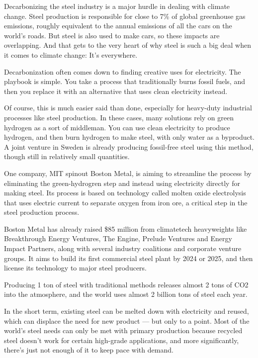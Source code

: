 \documentclass[
]{book}
\begin{document}
Decarbonizing the steel industry is a major hurdle in dealing with climate change. Steel production is responsible for close to 7\% of global greenhouse gas emissions, roughly equivalent to the annual emissions of all the cars on the world's roads. But steel is also used to make cars, so these impacts are overlapping. And that gets to the very heart of why steel is such a big deal when it comes to climate change: It's everywhere.

Decarbonization often comes down to finding creative uses for electricity. The playbook is simple. You take a process that traditionally burns fossil fuels, and then you replace it with an alternative that uses clean electricity instead.

Of course, this is much easier said than done, especially for heavy-duty industrial processes like steel production. In these cases, many solutions rely on green hydrogen as a sort of middleman. You can use clean electricity to produce hydrogen, and then burn hydrogen to make steel, with only water as a byproduct. A joint venture in Sweden is already producing fossil-free steel using this method, though still in relatively small quantities.

One company, MIT spinout Boston Metal, is aiming to streamline the process by eliminating the green-hydrogren step and instead using electricity directly for making steel. Its process is based on technology called molten oxide electrolysis that uses electric current to separate oxygen from iron ore, a critical step in the steel production process.

Boston Metal has already raised \$85 million from climatetech heavyweights like Breakthrough Energy Ventures, The Engine, Prelude Ventures and Energy Impact Partners, along with several industry coalitions and corporate venture groups. It aims to build its first commercial steel plant by 2024 or 2025, and then license its technology to major steel producers.

Producing 1 ton of steel with traditional methods releases almost 2 tons of CO2 into the atmosphere, and the world uses almost 2 billion tons of steel each year.

In the short term, existing steel can be melted down with electricity and reused, which can displace the need for new product --- but only to a point. Most of the world's steel needs can only be met with primary production because recycled steel doesn't work for certain high-grade applications, and more significantly, there's just not enough of it to keep pace with demand.
\end{document}
